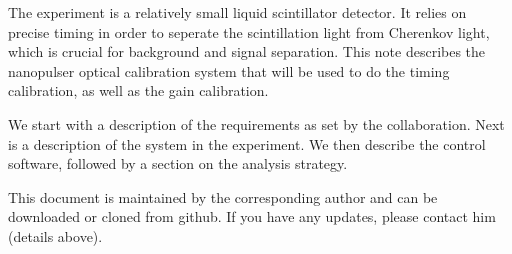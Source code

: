 

The \jsns experiment\cite{JSNS2TDR} is a relatively small liquid scintillator detector. It relies on precise timing in order to seperate the scintillation light from Cherenkov light, which is crucial for background and signal separation. This note describes the \jsns nanopulser optical calibration system that will be used to do the timing calibration, as well as the gain calibration.

We start with a description of the requirements as set by the \jsns collaboration. Next is a description of the system in the experiment. We then describe the control software, followed by a section on the analysis strategy.

This document is maintained by the corresponding author and can be downloaded or cloned from github\cite{GITHUB_DOC}. If you have any updates, please contact him (details above).

